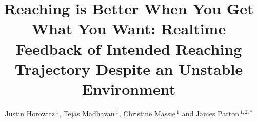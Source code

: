 \documentclass{frontiersSCNS} %
\def\firstAuthorLast{Horowitz {et~al.}} %
\def\Authors{Justin Horowitz\,$^1$, Tejas Madhavan\,$^1$, Christine Massie\,$^1$ and James Patton\,$^{1,2,*}$}
\begin{document}
\onecolumn
{}

\title[Realtime Feedback of Intended Trajectory]{Reaching is Better When You Get What You Want: Realtime Feedback of Intended Reaching Trajectory Despite an Unstable Environment}
\author[\firstAuthorLast ]{\Authors}
\address{}
\correspondance{}
\extraAuth{}%
\topic{}%

\maketitle

\end{document}
